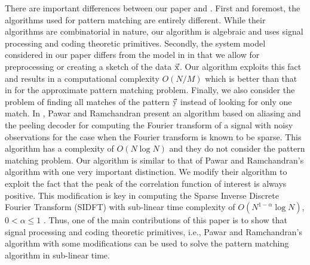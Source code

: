 There are important differences between our paper and \cite{hassanieh2012faster,andoni2013shift,boyer1977fast,amir2004faster}. First and foremost, the algorithms used for pattern matching are entirely different. While their algorithms are combinatorial in nature, our algorithm is algebraic and uses signal processing and coding theoretic primitives. Secondly, the system model considered in our paper differs from the model in \cite{hassanieh2012faster,andoni2013shift,boyer1977fast,amir2004faster} in that we allow for preprocessing or creating a sketch of the data $\vec{\mathrm{x}}$. Our algorithm exploits this fact and results in a computational complexity $O(N/M)$ which is better than that in \cite{andoni2013shift} for the approximate pattern matching problem.  Finally, we also consider the problem of finding all matches of the pattern $\vec{\mathrm{y}}$ instead of looking for only one match. In \cite{pawar2014robust}, Pawar and Ramchandran present an algorithm based on aliasing and the peeling decoder for computing the Fourier transform of a signal with noisy observations for the case when the Fourier transform is known to be sparse. This algorithm has a complexity of $O(N \log N)$ and they do not consider the pattern matching problem. Our algorithm is similar to that of Pawar and Ramchandran's algorithm with one very important distinction. We modify their algorithm to exploit the fact that the peak of the correlation function of interest is always positive. This modification is key in computing the Sparse Inverse Discrete Fourier Transform (SIDFT) with sub-linear time complexity of $O(N^{1-\alpha} \log N)$, $0 < \alpha \leq 1$ . Thus, one of the main contributions of this paper is to show that signal processing and coding theoretic primitives, i.e., Pawar and Ramchandran's algorithm with some modifications can be used to solve the pattern matching algorithm in sub-linear time. 
